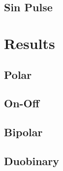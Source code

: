\documentclass{article}
\begin{document}
\subsection{Sin Pulse}











\section{Results}

\subsection{Polar}

\subsection{On-Off}

\subsection{Bipolar}

\subsection{Duobinary}
\end{document}
